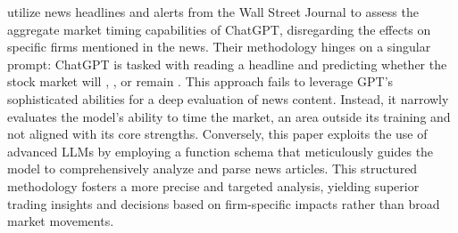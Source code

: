 \cite{chen2023chatgpt} utilize news headlines and alerts from the Wall Street Journal to assess the aggregate market timing capabilities of ChatGPT, disregarding the effects on specific firms mentioned in the news.  
Their methodology hinges on a singular prompt: ChatGPT is tasked with reading a headline and predicting whether the stock market will , , or remain .
This approach fails to leverage GPT's sophisticated abilities for a deep evaluation of news content. Instead, it narrowly evaluates the model's ability to time the market, an area outside its training and not aligned with its core strengths. Conversely, this paper exploits the use of advanced LLMs by employing a function schema that meticulously guides the model to comprehensively analyze and parse news articles. This structured methodology fosters a more precise and targeted analysis, yielding superior trading insights and decisions based on firm-specific impacts rather than broad market movements.
